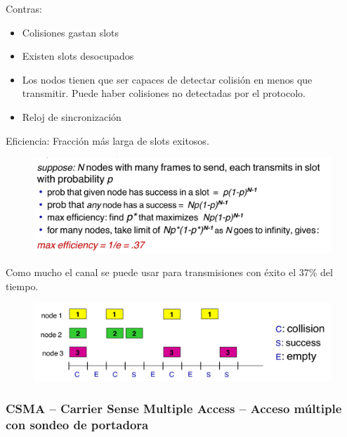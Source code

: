 \documentclass[12pt, twoside, openright]{report} %
\begin{document}
          Contras:

          \begin{itemize}
          \item
            Colisiones gastan slots
          \item
            Existen slots desocupados
          \item
            Los nodos tienen que ser capaces de detectar colisión en
            menos que transmitir. Puede haber colisiones no detectadas
            por el protocolo.
          \item
            Reloj de sincronización
          \end{itemize}

          Eficiencia: Fracción más larga de slots exitosos.
          \begin{figure}[H]
            {\includegraphics[scale=.25]{Untitled 51.png}}
          \end{figure}
          Como mucho el canal se puede usar para transmisiones con éxito
          el 37\% del tiempo.
          \begin{figure}[H]
            {\includegraphics[scale=.25]{Untitled 52.png}}
          \end{figure}

\subsubsection{CSMA -- Carrier Sense Multiple Access -- Acceso múltiple con
sondeo de portadora}

        
        
\end{document}
